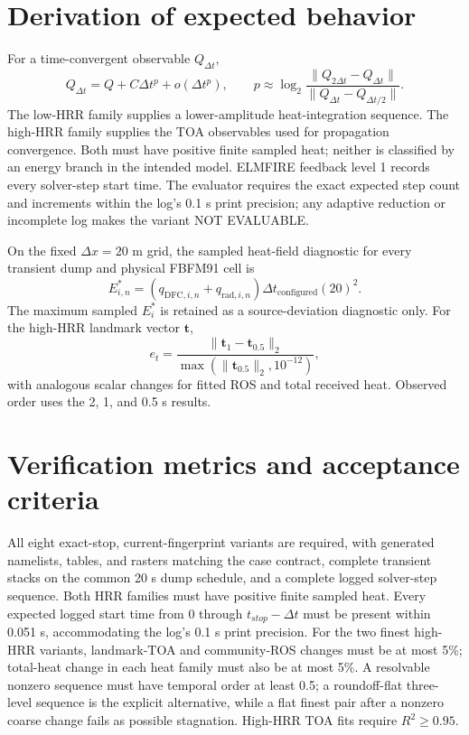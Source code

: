 \section{Derivation of expected behavior}
For a time-convergent observable $Q_{\Delta t}$,
\begin{equation}
 Q_{\Delta t}=Q+C\Delta t^p+o(\Delta t^p),
 \qquad
 p\approx\log_2\frac{\lVert Q_{2\Delta t}-Q_{\Delta t}\rVert}
 {\lVert Q_{\Delta t}-Q_{\Delta t/2}\rVert}.
\end{equation}
The low-HRR family supplies a lower-amplitude heat-integration sequence. The
high-HRR family supplies the TOA observables used for propagation convergence.
Both must have positive finite sampled heat; neither is classified by an
energy branch in the intended model. ELMFIRE feedback level 1
records every solver-step start time.  The evaluator requires the exact expected
step count and increments within the log's 0.1 s print precision; any adaptive
reduction or incomplete log makes the variant NOT EVALUABLE.

On the fixed $\Delta x=20$ m grid, the sampled heat-field diagnostic for every
transient dump and physical FBFM91 cell is
\[
 E_{i,n}^{*}=(q_{\mathrm{DFC},i,n}+q_{\mathrm{rad},i,n})
 \Delta t_{\mathrm{configured}}(20)^2.
\]
The maximum sampled $E_i^{*}$ is retained as a source-deviation diagnostic
only. For the high-HRR landmark vector $\mathbf{t}$,
\[
 e_t=\frac{\lVert\mathbf{t}_{1}-\mathbf{t}_{0.5}\rVert_2}
 {\max(\lVert\mathbf{t}_{0.5}\rVert_2,10^{-12})},
\]
with analogous scalar changes for fitted ROS and total received heat.  Observed order uses the 2, 1, and 0.5 s results.

\section{Verification metrics and acceptance criteria}
All eight exact-stop, current-fingerprint variants are required, with generated namelists, tables, and rasters matching the case contract, complete transient stacks on the common 20 s dump schedule, and a complete logged solver-step sequence. Both HRR families must have positive finite sampled heat. Every expected logged start time from 0 through $t_{stop}-\Delta t$ must be present within 0.051 s, accommodating the log's 0.1 s print precision. For the two finest high-HRR variants, landmark-TOA and community-ROS changes must be at most 5\%; total-heat change in each heat family must also be at most 5\%. A resolvable nonzero sequence must have temporal order at least 0.5; a roundoff-flat three-level sequence is the explicit alternative, while a flat finest pair after a nonzero coarse change fails as possible stagnation. High-HRR TOA fits require $R^2\geq0.95$.

